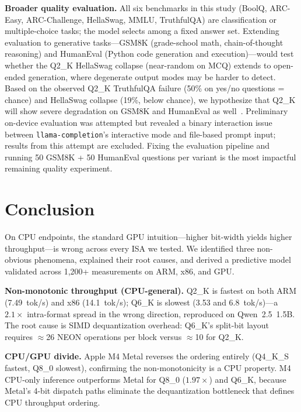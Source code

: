 \documentclass[conference]{IEEEtran}
\begin{document}
\textbf{Broader quality evaluation.}
All six benchmarks in this study (BoolQ, ARC-Easy, ARC-Challenge, HellaSwag,
MMLU, TruthfulQA) are classification or multiple-choice tasks; the model selects
among a fixed answer set.
Extending evaluation to generative tasks---GSM8K (grade-school math, chain-of-thought
reasoning) and HumanEval (Python code generation and execution)---would test
whether the Q2\_K HellaSwag collapse (near-random on MCQ) extends to open-ended
generation, where degenerate output modes may be harder to detect.
Based on the observed Q2\_K TruthfulQA failure (50\% on yes/no questions = chance)
and HellaSwag collapse (19\%, below chance), we hypothesize that Q2\_K will
show severe degradation on GSM8K and HumanEval as well~\cite{li_eval}.
Preliminary on-device evaluation was attempted but revealed a binary interaction
issue between \texttt{llama-completion}'s interactive mode and file-based prompt
input; results from this attempt are excluded.
Fixing the evaluation pipeline and running 50 GSM8K + 50 HumanEval questions
per variant is the most impactful remaining quality experiment.

\section{Conclusion}

On CPU endpoints, the standard GPU intuition---higher bit-width yields higher
throughput---is wrong across every ISA we tested.
We identified three non-obvious phenomena, explained their root causes, and derived
a predictive model validated across 1,200+ measurements on ARM, x86, and GPU.

\textbf{Non-monotonic throughput (CPU-general).}
Q2\_K is fastest on both ARM (7.49~tok/s) and x86 (14.1~tok/s);
Q6\_K is slowest (3.53 and 6.8~tok/s)---a $2.1\times$ intra-format spread in
the wrong direction, reproduced on Qwen~2.5~1.5B.
The root cause is SIMD dequantization overhead: Q6\_K's split-bit layout
requires $\approx$26 NEON operations per block versus $\approx$10 for Q2\_K.

\textbf{CPU/GPU divide.}
Apple M4 Metal reverses the ordering entirely (Q4\_K\_S fastest, Q8\_0 slowest),
confirming the non-monotonicity is a CPU property.
M4 CPU-only inference outperforms Metal for Q8\_0 ($1.97\times$) and Q6\_K,
because Metal's 4-bit dispatch paths eliminate the dequantization bottleneck
that defines CPU throughput ordering.
\end{document}
